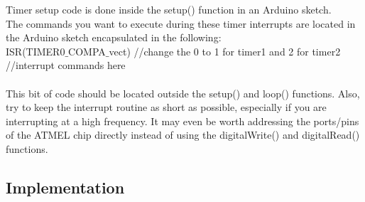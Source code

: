 \documentclass[a4paper]{article}
\begin{document}
\medskip
Timer setup code is done inside the setup(){} function in an Arduino sketch.\bigskip\\
The commands you want to execute during these timer interrupts are located in the Arduino sketch encapsulated in the following:\bigskip\\
ISR(TIMER0$\_$COMPA$\_$vect){  //change the 0 to 1 for timer1 and 2 for timer2\\
   //interrupt commands here\\
}\\
This bit of code should be located outside the setup() and loop() functions.  Also, try to keep the interrupt routine as short as possible, especially if you are interrupting at a high frequency.  It may even be worth addressing the ports/pins of the ATMEL chip directly instead of using the digitalWrite() and digitalRead() functions.\bigskip\\
\subsection{Implementation}
\end{document}
